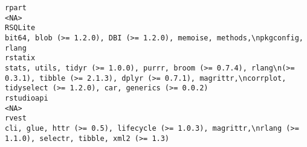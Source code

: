 \documentclass[
  letterpaper,
  DIV=11,
  numbers=noendperiod]{scrreprt}
\begin{document}
\begin{verbatim}
rpart                                                                                                                                                                                                                                                                                                                                                                                                                                                                                                                                                                                                                 <NA>
RSQLite                                                                                                                                                                                                                                                                                                                                                                                                                                                                                                                                        bit64, blob (>= 1.2.0), DBI (>= 1.2.0), memoise, methods,\npkgconfig, rlang
rstatix                                                                                                                                                                                                                                                                                                                                                                                                                              stats, utils, tidyr (>= 1.0.0), purrr, broom (>= 0.7.4), rlang\n(>= 0.3.1), tibble (>= 2.1.3), dplyr (>= 0.7.1), magrittr,\ncorrplot, tidyselect (>= 1.2.0), car, generics (>= 0.0.2)
rstudioapi                                                                                                                                                                                                                                                                                                                                                                                                                                                                                                                                                                                                            <NA>
rvest                                                                                                                                                                                                                                                                                                                                                                                                                                                                                                          cli, glue, httr (>= 0.5), lifecycle (>= 1.0.3), magrittr,\nrlang (>= 1.1.0), selectr, tibble, xml2 (>= 1.3)

\end{verbatim}
\end{document}
